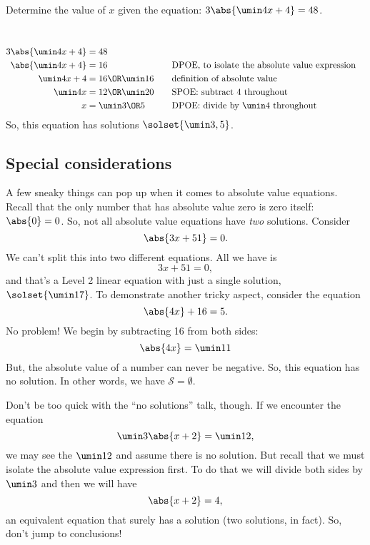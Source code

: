 \begin{boxedex}
Determine the value of $x$ given the equation: $3\abs{\umin4x+4} = 48$.

\exsoln\ 
\[\begin{aligned}
3\abs{\umin4x+4} &= 48\\
\abs{\umin4x+4} &= 16
&&\text{\quad DPOE, to isolate the absolute value expression}\\
\umin4x+4 &= 16 \OR \umin16
&&\text{\quad definition of absolute value}\\
\umin4x &= 12 \OR \umin20
&&\text{\quad SPOE: subtract 4 throughout}\\
x &= \umin3 \OR 5
&&\text{\quad DPOE: divide by $\umin4$ throughout}
\end{aligned}\]
So, this equation has solutions $\solset{\umin3, 5}$.
\end{boxedex}

\subsection{Special considerations}

A few sneaky things can pop up when it comes to absolute value equations. Recall that the only number that has absolute value zero is zero itself: $\abs{0} = 0$. So, not all absolute value equations have \textit{two} solutions. Consider
\[\abs{3x + 51} = 0.\]
We can't split this into two different equations. All we have is
\[3x + 51 = 0,\]
and that's a Level 2 linear equation with just a single solution, $\solset{\umin17}$. To demonstrate another tricky aspect, consider the equation \[\abs{4x} + 16 = 5.\]
No problem! We begin by subtracting 16 from both sides:
\[\abs{4x} = \umin11\]
But, the absolute value of a number can never be negative. So, this equation has no solution. In other words, we have $\mathcal{S} = \emptyset$.

Don't be too quick with the ``no solutions'' talk, though. If we encounter the equation \[\umin3\abs{x + 2} = \umin12,\] we may see the $\umin12$ and assume there is no solution. But recall that we must isolate the absolute value expression first. To do that we will divide both sides by $\umin3$ and then we will have \[\abs{x+2} = 4,\] an equivalent equation that surely has a solution (two solutions, in fact). So, don't jump to conclusions!

